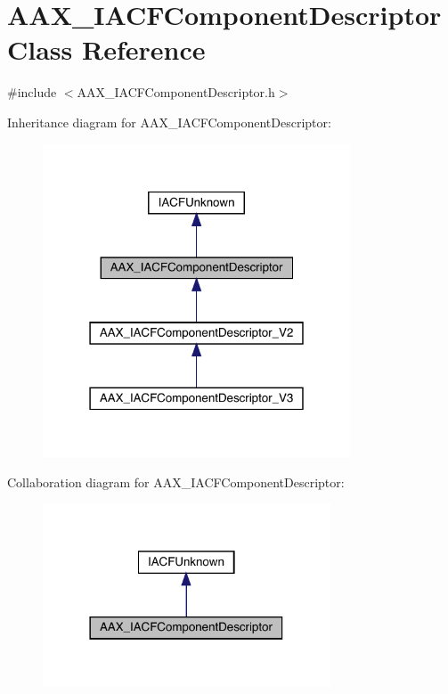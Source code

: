\hypertarget{a01625}{}\section{A\+A\+X\+\_\+\+I\+A\+C\+F\+Component\+Descriptor Class Reference}
\label{a01625}


{\ttfamily \#include $<$A\+A\+X\+\_\+\+I\+A\+C\+F\+Component\+Descriptor.\+h$>$}



Inheritance diagram for A\+A\+X\+\_\+\+I\+A\+C\+F\+Component\+Descriptor\+:
\nopagebreak
\begin{figure}[H]
\begin{center}
\leavevmode
\includegraphics[width=259pt]{a01624}
\end{center}
\end{figure}


Collaboration diagram for A\+A\+X\+\_\+\+I\+A\+C\+F\+Component\+Descriptor\+:
\nopagebreak
\begin{figure}[H]
\begin{center}
\leavevmode
\includegraphics[width=242pt]{a01623}
\end{center}
\end{figure}


